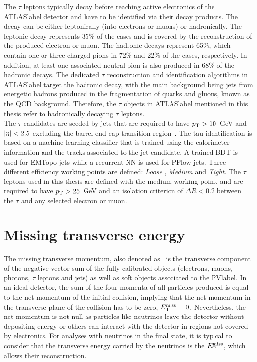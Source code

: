 The $\tau$ leptons typically decay before reaching active electronics of the \acrshort{ATLASlabel} detector and have to be identified via their decay products. The decay can be either leptonically (into electrons or muons) or hadronically. The leptonic decay represents 35\% of the cases and is covered by the reconstruction of the produced electron or muon. The hadronic decays represent 65\%, which contain one or three charged pions in 72\% and 22\% of the cases, respectively. In addition, at least one associated neutral pion is also produced in 68\% of the hadronic decays. The dedicated $\tau$ reconstruction and identification algorithms in \acrshort{ATLASlabel} target the hadronic decay, with the main background being jets from energetic hadrons produced in the fragmentation of quarks and gluons, known as the \acrshort{QCD} background. Therefore, the $\tau$ objects in \acrshort{ATLASlabel} mentioned in this thesis refer to hadronically decaying $\tau$ leptons. \\

The $\tau$ candidates are seeded by jets that are required to have $p_{\text{T}} > 10$~GeV and $\abs{\eta} < 2.5$ excluding the barrel-end-cap transition region~\cite{ATLAS-CONF-2017-029}. The tau identification is based on a machine learning classifier that is trained using the calorimeter information and the tracks associated to the jet candidate. A trained BDT is used for EMTopo jets while a recurrent NN is used for PFlow jets. Three different efficiency working points are defined: \textit{Loose
}, \textit{Medium} and \textit{Tight}. The $\tau$ leptons used in this thesis are defined with the medium working point, and are required to have $p_{\text{T}}>25$~GeV and an isolation criterion of $\Delta R<0.2$ between the $\tau$ and any selected electron or muon.

\section{Missing transverse energy}

The missing transverse momentum, also denoted as \MET\ is the transverse component of the negative vector sum of the fully calibrated objects (electrons, muons, photons, $\tau$ leptons and jets) as well as soft objects associated to the \acrshort{PVlabel}. In an ideal detector, the sum of the four-momenta of all particles produced is equal to the net momentum of the initial collision, implying that the net momentum in the transverse plane of the collision has to be zero, $E_{\text{T}}^{\text{miss}}=0$. Nevertheless, the net momentum is not null as particles like neutrinos leave the detector without depositing energy or others can interact with the detector in regions not covered by electronics. For analyses with neutrinos in the final state, it is typical to consider that the transverse energy carried by the neutrinos is the $E_{\text{T}}^{\text{miss}}$, which allows their reconstruction.